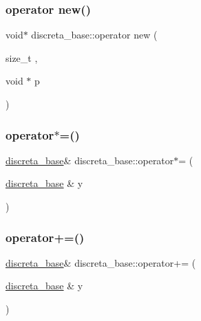 \subsubsection{\texorpdfstring{operator new()}{operator new()}}
{\footnotesize\ttfamily void$\ast$ discreta\+\_\+base\+::operator new (\begin{DoxyParamCaption}\item[{size\+\_\+t}]{,  }\item[{void $\ast$}]{p }\end{DoxyParamCaption})\hspace{0.3cm}{\ttfamily [inline]}}

\mbox{\label{classdiscreta__base_a26a19fcfe00422fe1d8a66d5b1b4a60a}} 
\subsubsection{\texorpdfstring{operator$\ast$=()}{operator*=()}}
{\footnotesize\ttfamily \mbox{\hyperlink{classdiscreta__base}{discreta\+\_\+base}}\& discreta\+\_\+base\+::operator$\ast$= (\begin{DoxyParamCaption}\item[{\mbox{\hyperlink{classdiscreta__base}{discreta\+\_\+base}} \&}]{y }\end{DoxyParamCaption})\hspace{0.3cm}{\ttfamily [inline]}}

\mbox{\label{classdiscreta__base_ad0b0a337ccba39d87fe21ffe15bef951}} 
\subsubsection{\texorpdfstring{operator+=()}{operator+=()}}
{\footnotesize\ttfamily \mbox{\hyperlink{classdiscreta__base}{discreta\+\_\+base}}\& discreta\+\_\+base\+::operator+= (\begin{DoxyParamCaption}\item[{\mbox{\hyperlink{classdiscreta__base}{discreta\+\_\+base}} \&}]{y }\end{DoxyParamCaption})\hspace{0.3cm}{\ttfamily [inline]}}

